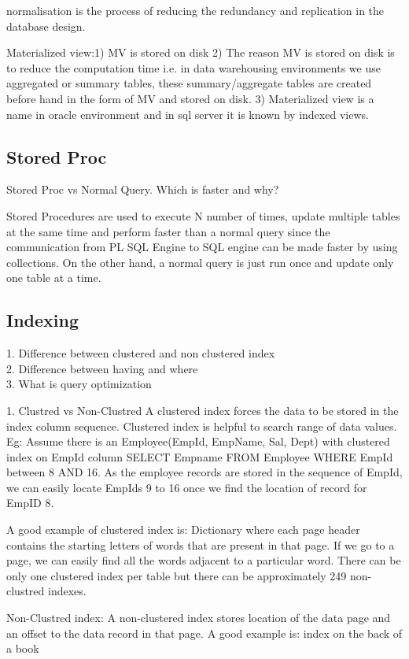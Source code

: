 normalisation is the process of reducing the redundancy and replication in the database design.

Materialized view:1) MV is stored on disk 2) The reason MV is stored on disk is to reduce the computation 
time i.e. in data warehousing environments we use aggregated or summary tables, these summary/aggregate tables are created before hand in the form of MV and stored on disk. 3) 
Materialized view is a name in oracle environment and in sql server it is known by indexed views.

\subsection{Stored Proc}
Stored Proc vs Normal Query. Which is faster and why?

Stored Procedures are used to execute N number of times, update multiple tables at the same time and perform faster than a normal query since the communication from PL SQL Engine 
to SQL engine can be made faster by using collections. On the other hand, a normal query is just run once and update only one table at a time.

\subsection{Indexing}

1. Difference between clustered and non clustered index \\
2. Difference between having and where \\
3. What is query optimization

1. Clustred vs Non-Clustred
A clustered index forces the data to be stored in the index column sequence. Clustered index is helpful to search range of data values.
Eg: Assume there is an Employee(EmpId, EmpName, Sal, Dept) with clustered index on EmpId column
SELECT Empname 
FROM Employee
WHERE EmpId between 8 AND 16.
As the employee records are stored in the sequence of EmpId, we can easily locate EmpIds 9 to 16 once we find the location of record for EmpID 8.

A good example of clustered index is: Dictionary where each page header contains the starting letters of words that are present in that page. If we go to a page, we can easily 
find all the words adjacent to a particular word.
There can be only one clustered index per table but there can be approximately 249 non-clustred indexes.

Non-Clustred index: A non-clustered index stores location of the data page and an offset to the data record in that page. 
A good example is: index on the back of a book

